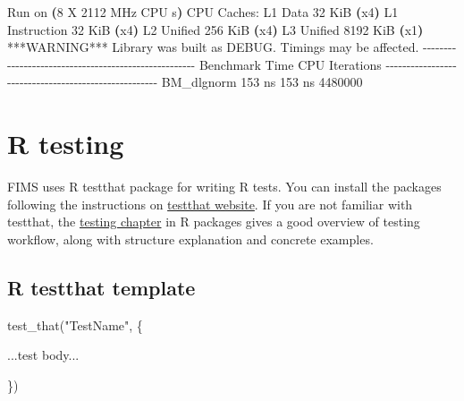 \documentclass[
]{book}
\newenvironment{Shaded}{\begin{snugshade}}{\end{snugshade}}
\newcommand{\ErrorTok}[1]{\textcolor[rgb]{0.64,0.00,0.00}{\textbf{#1}}}
\newcommand{\ExtensionTok}[1]{#1}
\newcommand{\FunctionTok}[1]{\textcolor[rgb]{0.00,0.00,0.00}{#1}}
\newcommand{\KeywordTok}[1]{\textcolor[rgb]{0.13,0.29,0.53}{\textbf{#1}}}
\newcommand{\NormalTok}[1]{#1}
\newcommand{\StringTok}[1]{\textcolor[rgb]{0.31,0.60,0.02}{#1}}
\begin{document}
\begin{Shaded}
\begin{Highlighting}[]

\ExtensionTok{Run}\NormalTok{ on }\ErrorTok{(}\ExtensionTok{8}\NormalTok{ X 2112 MHz CPU s}\KeywordTok{)}
\ExtensionTok{CPU}\NormalTok{ Caches:}
  \ExtensionTok{L1}\NormalTok{ Data 32 KiB }\ErrorTok{(}\ExtensionTok{x4}\KeywordTok{)}
\ExtensionTok{L1}\NormalTok{ Instruction 32 KiB }\ErrorTok{(}\ExtensionTok{x4}\KeywordTok{)}
\ExtensionTok{L2}\NormalTok{ Unified 256 KiB }\ErrorTok{(}\ExtensionTok{x4}\KeywordTok{)}
\ExtensionTok{L3}\NormalTok{ Unified 8192 KiB }\ErrorTok{(}\ExtensionTok{x1}\KeywordTok{)}
\ExtensionTok{***WARNING***}\NormalTok{ Library was built as DEBUG. Timings may be affected.}
\ExtensionTok{{-}{-}{-}{-}{-}{-}{-}{-}{-}{-}{-}{-}{-}{-}{-}{-}{-}{-}{-}{-}{-}{-}{-}{-}{-}{-}{-}{-}{-}{-}{-}{-}{-}{-}{-}{-}{-}{-}{-}{-}{-}{-}{-}{-}{-}{-}{-}{-}{-}{-}{-}{-}{-}}
  \ExtensionTok{Benchmark}\NormalTok{           Time             CPU   Iterations}
\ExtensionTok{{-}{-}{-}{-}{-}{-}{-}{-}{-}{-}{-}{-}{-}{-}{-}{-}{-}{-}{-}{-}{-}{-}{-}{-}{-}{-}{-}{-}{-}{-}{-}{-}{-}{-}{-}{-}{-}{-}{-}{-}{-}{-}{-}{-}{-}{-}{-}{-}{-}{-}{-}{-}{-}}
  \ExtensionTok{BM\_dlgnorm}\NormalTok{        153 ns          153 ns      4480000}
\end{Highlighting}
\end{Shaded}

\hypertarget{r-testing}{%
\section{R testing}\label{r-testing}}

FIMS uses R testthat package for writing R tests. You can install the packages following the instructions on \href{https://testthat.r-lib.org/}{testthat website}. If you are not familiar with testthat, the \href{https://r-pkgs.org/tests.html}{testing chapter} in R packages gives a good overview of testing workflow, along with structure explanation and concrete examples.

\hypertarget{r-testthat-template}{%
\subsection{R testthat template}\label{r-testthat-template}}

\begin{Shaded}
\begin{Highlighting}[]
\FunctionTok{test\_that}\NormalTok{(}\StringTok{"TestName"}\NormalTok{, \{}
  
\NormalTok{  ...test body...}
  
\NormalTok{\})}
\end{Highlighting}
\end{Shaded}
\end{document}
